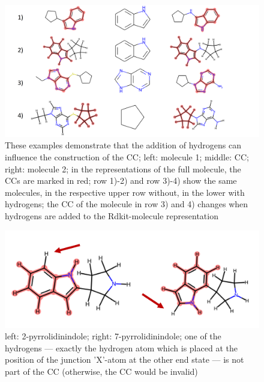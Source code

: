\begin{figure}
	
	\includegraphics[scale=0.13]{hydrogens_plus_minus_v2.png}
	\caption{These examples demonstrate that the addition of hydrogens can influence the construction of the CC; left: molecule 1; middle: CC; right: molecule 2; in the representations of the full molecule, the CCs are marked in red; row 1)-2) and row 3)-4) show the same molecules, in the respective upper row without,
		in the lower with hydrogens; the CC of the molecule in row 3) and 4)  changes when hydrogens are added to the Rdkit-molecule
		representation}
		\label{fig:hydrogen_effect}
\end{figure}



\begin{figure}
	\includegraphics[scale=1.0]{pyrrolidinindole_v2}
	
	\caption{
		left: 2-pyrrolidinindole; right: 7-pyrrolidinindole; 
		one of the hydrogens --- exactly the hydrogen atom which is placed at the position of the junction 'X'-atom at the other end state --- is not part of the CC (otherwise, the CC would be invalid)}
	\label{fig:pyrrolidinindole}
\end{figure}


